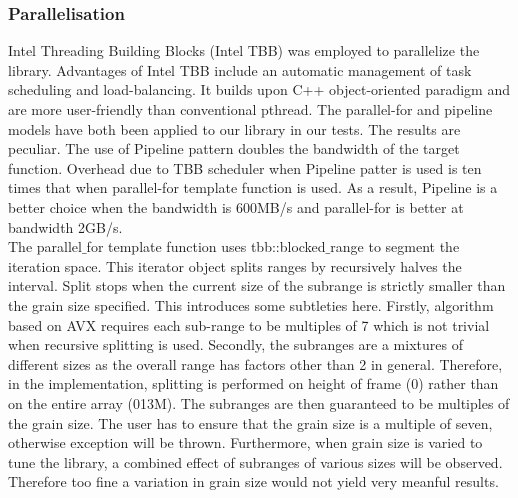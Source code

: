 \documentclass[journal]{IEEEtran}
\begin{document}
\subsubsection{Parallelisation}
Intel Threading Building Blocks (Intel TBB) was employed to parallelize the library. Advantages of Intel TBB include an automatic management of task scheduling and load-balancing. It builds upon C++ object-oriented paradigm and are more user-friendly than conventional pthread. The parallel-for and pipeline models have both been applied to our library in our tests. The results are peculiar. The use of Pipeline pattern doubles the bandwidth of the target function. Overhead due to TBB scheduler when Pipeline patter is used is ten times that when parallel-for template function is used. As a result, Pipeline is a better choice when the bandwidth is \texttildelow 600MB/s and parallel-for is better at bandwidth \texttildelow 2GB/s. \\
The parallel$\_$for template function uses tbb::blocked$\_$range to segment the iteration space. This iterator object splits ranges by recursively halves the interval. Split stops when the current size of the subrange is strictly smaller than the grain size specified. This introduces some subtleties here. Firstly, algorithm based on AVX requires each sub-range to be multiples of 7 which is not trivial when recursive splitting is used. Secondly, the subranges are a mixtures of different sizes as the overall range has factors other than 2 in general. Therefore, in the implementation, splitting is performed on height of frame (0) rather than on the entire array (0\texttildelow13M). The subranges are then guaranteed to be multiples of the grain size. The user has to ensure that the grain size is a multiple of seven, otherwise exception will be thrown. Furthermore, when grain size is varied to tune the library, a combined effect of subranges of various sizes will be observed. Therefore too fine a variation in grain size would not yield very meanful results.
\end{document}
